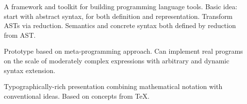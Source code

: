 \todo{}
A framework and toolkit for building programming language tools. Basic idea: start with abstract syntax, for both definition and representation. Transform ASTs via reduction. Semantics and concrete syntax both defined by reduction from AST.

Prototype based on meta-programming approach. Can implement real programs on the scale of moderately complex expressions with arbitrary and dynamic syntax extension.

Typographically-rich presentation combining mathematical notation with conventional ideas. Based on concepts from \TeX. \todo{}
